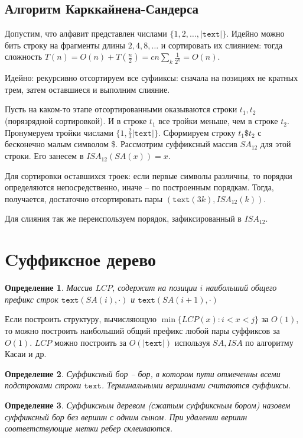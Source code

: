 \documentclass[10pt]{book}
\theoremstyle{plain}
\newtheorem{definition}{Определение}[section]
\newcommand{\textm}{\texttt{text}}
\begin{document}
\subsection{Алгоритм Карккайнена-Сандерса}

Допустим, что алфавит представлен числами $\{1,2,\ldots,|\textm|\}$.
Идейно можно бить строку на фрагменты длины $2, 4, 8, \ldots$ и сортировать
их слиянием: тогда сложность
$T(n) = O(n) + T(\frac{n}{2}) = cn \sum_k \frac{1}{2^k} = O(n)$.

Идейно: рекурсивно отсортируем все суфииксы: сначала на позициях не кратных
трем, затем оставшиеся и выполним слияние.

Пусть на каком-то этапе
отсортированными оказываются строки $t_1, t_2$ (порязрядной сортировкой).
И в строке $t_1$ все тройки меньше, чем в строке $t_2$. Пронумеруем тройки
числами $\{1, \frac{2}{3}|\textm|\}$. Сформируем строку $t_1 \$ t_2$ с
бесконечно малым символом \$. Рассмотрим суффиксный массив $SA_{12}$ для этой
строки. Его занесем в $ISA_{12}(SA(x)) = x$.

Для сортировки оставшихся троек: если первые символы различны, то порядки
определяются непосредственно, иначе -- по построенным порядкам. Тогда,
получается, достаточно отсортировать пары $(\textm(3k), ISA_{12}(k))$.

Для слияния так же переиспользуем порядок, зафиксированный в $ISA_{12}$.

\section{Cуффиксное дерево}

\begin{definition}
  Массив $LCP$, содержит на позиции $i$ наибольший общего префикс строк
  $\textm(SA(i), \cdot)$ и $\textm(SA(i + 1), \cdot)$
\end{definition}

Если построить структуру,
вычисляющую $\min \{ LCP(x) : i < x < j \}$ за $O(1)$, то можно построить
наибольший общий префикс любой пары суффиксов за $O(1)$. $LCP$ можно построить
за $O(|\textm|)$ используя $SA, ISA$ по алгоритму Касаи и др.

\begin{definition}
  Суффиксный бор -- бор, в котором пути отмеченны всеми подстроками строки
  $\textm$. Терминальными вершинами считаются суффиксы.
\end{definition}

\begin{definition}
  Суффиксным деревом (сжатым суффиксным бором) назовем суффиксный бор без
  вершин с одним сыном. При удалении вершин соответствующие метки ребер
  склеиваются.
\end{definition}
\end{document}
